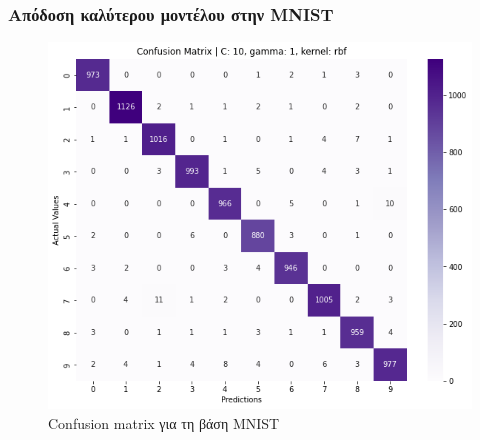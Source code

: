 \documentclass{beamer}
\begin{document}
\begin{frame}
\frametitle{Απόδοση καλύτερου μοντέλου στην MNIST}

\begin{figure}[H]
    \centering
    \includegraphics[width=0.6\linewidth]{figures/mnist/confusion_matrix.png}
    \caption{Confusion matrix για τη βάση MNIST}
    \label{fig:mnist_confusion}
\end{figure}

\end{frame}
\end{document}
